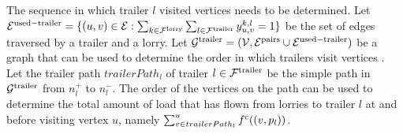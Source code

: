 The sequence in which trailer $l$ visited vertices needs to be determined.
Let
$\mathcal E^{\rm used-trailer} = \{ (u,v) \in \mathcal E : \sum_{k \in \mathcal F^{\rm lorry}} \sum_{l \in \mathcal F^{\rm trailer}} y^{k,l}_{u,v} = 1  \} $ be the set of edges traversed by a trailer and a lorry.
Let
$\mathcal G^{\rm trailer} = (\mathcal V, \mathcal E^{\rm pairs} \cup \mathcal  E^{\rm used-trailer}  ) $ be a graph that can be used to determine the order in which trailers visit vertices . \\

Let  the trailer path $trailerPath_l$ of trailer
$l \in \mathcal F^{\rm trailer}$
be the simple path in
$\mathcal  G^{\rm trailer}$ from $n^+_l $ to $n^-_l $.
The order of the vertices on the path can be used to determine the total amount of load that has flown from lorries to trailer $l$ at and before visiting vertex $u$, namely
$ \sum_{v \in trailerPath_l}^u f^{\rm c}((v, p_l)) $.\\

